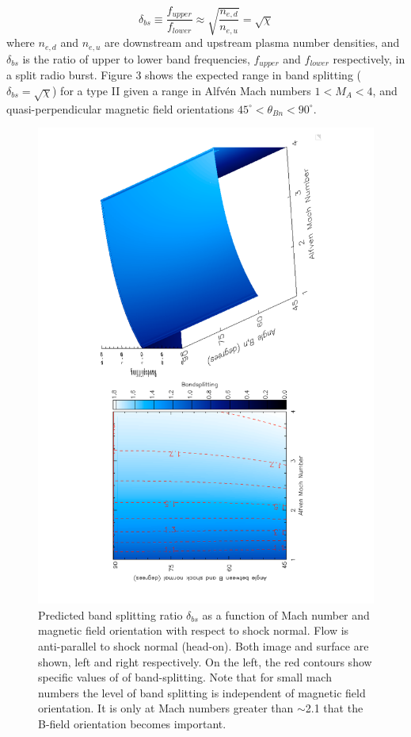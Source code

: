 \begin{equation}
\delta_{bs} \equiv \frac{f_{upper}}{f_{lower}} \approx \sqrt{ \frac{ n_{e,d} }{ n_{e,u} } }=\sqrt{\chi}
\end{equation}
where $n_{e,d}$ and $n_{e,u}$ are downstream and upstream plasma number densities, and $\delta_{bs}$ is the ratio of upper to lower band frequencies, $f_{upper}$ and $f_{lower}$ respectively, in a split radio burst. Figure 3 shows the expected range in band splitting ($\delta_{bs}=\sqrt{\chi}$) for a type II given a range in Alfv\'{e}n Mach numbers $1<M_A< 4$, and quasi-perpendicular magnetic field orientations $45^{\circ}<\theta_{Bn}<90^{\circ}$. 
\begin{figure}[h!]
\includegraphics[scale=0.5, angle=270,trim =  3cm 0cm 4cm 0cm]{images/MHD_vary_mach&thetaBn.pdf}
\caption{Predicted band splitting ratio $\delta_{bs}$ as a function of Mach number and magnetic field orientation with respect to shock normal. Flow is anti-parallel to shock normal (head-on). Both image and surface are shown, left and right respectively. On the left, the red contours show specific values of of band-splitting. Note that for small mach numbers the level of band splitting is independent of magnetic field orientation. It is only at Mach numbers greater than $\sim$2.1 that the B-field orientation becomes important.}
\label{fig:MHD_vary_mach&thetaBn}
\end{figure}
